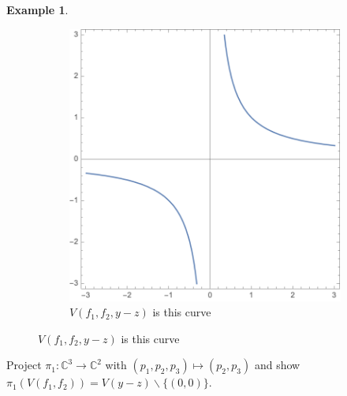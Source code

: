 \documentclass{article}
\theoremstyle{definition}
\newtheorem{ex}{Example}
\newcommand{\C}{\mathbb{C}}
\begin{document}
\begin{ex}
\begin{figure}[H]
\begin{subfigure}{0.5\textwidth}
        \includegraphics[width=1\linewidth]{13}
		\caption*{$V(f_1,f_2,y-z)$ is this curve}
		\label{fig:13}
		\end{subfigure}
	\end{figure}
 Project $\pi_1:\C^3\to\C^2$ with $(p_1,p_2,p_3)\mapsto (p_2,p_3)$ and show $\pi_1(V(f_1,f_2))=V(y-z)\backslash\{(0,0)\}$.

\end{ex}
\end{document}
